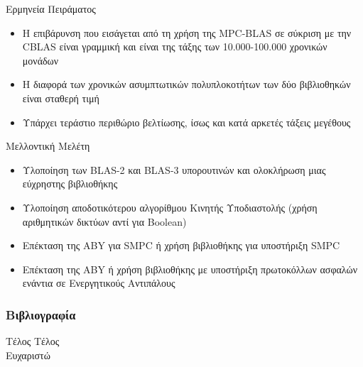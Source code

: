 \documentclass[10pt]{beamer}
\begin{document}
    \begin{frame}{Ερμηνεία Πειράματος}
        \begin{block}{}
            \begin{itemize}
                \item Η επιβάρυνση που εισάγεται από τη χρήση της MPC-BLAS σε σύκριση με την CBLAS είναι γραμμική και είναι της τάξης των 10.000-100.000 χρονικών μονάδων
                \item Η διαφορά των χρονικών ασυμπτωτικών πολυπλοκοτήτων των δύο βιβλιοθηκών είναι σταθερή τιμή
                \item Υπάρχει τεράστιο περιθώριο βελτίωσης, ίσως και κατά αρκετές τάξεις μεγέθους
            \end{itemize}
        \end{block}

    \end{frame}

    \begin{frame}{Μελλοντική Μελέτη}
        \begin{block}{}
        \begin{itemize}
            \item Υλοποίηση των BLAS-2 και BLAS-3 υπορουτινών και ολοκλήρωση μιας εύχρηστης βιβλιοθήκης
            \item Υλοποίηση αποδοτικότερου αλγορίθμου Κινητής Υποδιαστολής (χρήση αριθμητικών δικτύων αντί για Boolean)
            \item Επέκταση της ABY για SMPC ή χρήση βιβλιοθήκης για υποστήριξη SMPC
            \item Επέκταση της ABY ή χρήση βιβλιοθήκης με υποστήριξη πρωτοκόλλων ασφαλών ενάντια σε Ενεργητικούς Αντιπάλους
        \end{itemize}
            \end{block}
    \end{frame}

    \begin{frame}[t,allowframebreaks]
        \nocite{*}
        \frametitle{Βιβλιογραφία}
        \printbibliography
    \end{frame}

    \begin{frame}[c]{Τέλος}
        \centering
        Τέλος \\[20pt]
        Ευχαριστώ
    \end{frame}

%
\end{document}

